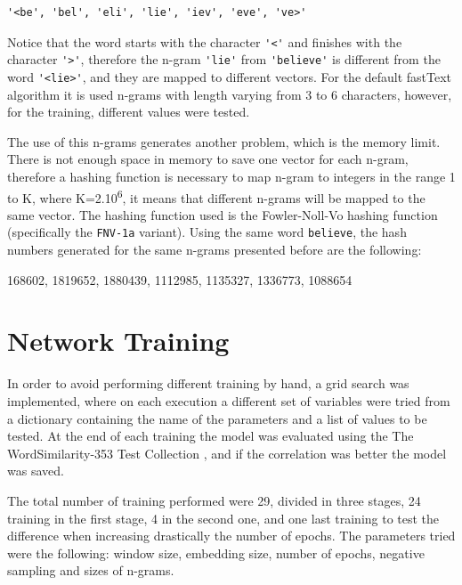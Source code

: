 \documentclass[11pt,oneside,a4paper]{article}
\begin{document}
\hfill\break
\begin{lstlisting}
'<be', 'bel', 'eli', 'lie', 'iev', 'eve', 've>'
\end{lstlisting}
\hfill\break

Notice that the word starts with the character \lstinline{'<'} and finishes with the character \lstinline{'>'}, therefore the n-gram \lstinline{'lie'} from \lstinline{'believe'} is different from the word \lstinline{'<lie>'}, and they are mapped to different vectors. For the default fastText algorithm it is used n-grams with length varying from 3 to 6 characters, however, for the training, different values were tested.

The use of this n-grams generates another problem, which is the memory limit. There is not enough space in memory to save one vector for each n-gram, therefore a hashing function is necessary to map n-gram to integers in the range 1 to K, where K=2.10\textsuperscript{6}, it means that different n-grams will be mapped to the same vector. The hashing function used is the Fowler-Noll-Vo hashing function (specifically the \lstinline{FNV-1a} variant)\cite{fnv-1a}.
Using the same word \lstinline{believe}, the hash numbers generated for the same n-grams presented before are the following:

\hfill\break
\begin{lstling}
168602, 1819652, 1880439, 1112985, 1135327, 1336773, 1088654
\end{lstling}
\hfill\break


\section{Network Training}

In order to avoid performing different training by hand, a grid search was implemented, where on each execution a different set of variables were tried from a dictionary containing the name of the parameters and a list of values to be tested. At the end of each training the model was evaluated using the The WordSimilarity-353 Test Collection \cite{wordsimilarity}, and if the correlation was better the model was saved.

The total number of training performed were 29, divided in three stages, 24 training in the first stage, 4 in the second one, and one last training to test the difference when increasing drastically the number of epochs. The parameters tried were the following: window size, embedding size, number of epochs, negative sampling and sizes of n-grams.
\end{document}
